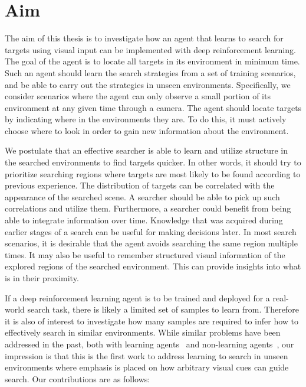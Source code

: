 \section{Aim}
\label{sec:aim}

The aim of this thesis is to investigate how an agent that learns to search for targets using visual input can be implemented with deep reinforcement learning.
The goal of the agent is to locate all targets in its environment in minimum time.
Such an agent should learn the search strategies from a set of training scenarios, and be able to carry out the strategies in unseen environments.
Specifically, we consider scenarios where the agent can only observe a small portion of its environment at any given time through a camera.
The agent should locate targets by indicating where in the environments they are.
To do this, it must actively choose where to look in order to gain new information about the environment.

We postulate that an effective searcher is able to learn and utilize structure in the searched environments to find targets quicker.
In other words, it should try to prioritize searching regions where targets are most likely to be found according to previous experience.
The distribution of targets can be correlated with the appearance of the searched scene.
A searcher should be able to pick up such correlations and utilize them.
Furthermore, a searcher could benefit from being able to integrate information over time.
Knowledge that was acquired during earlier stages of a search can be useful for making decisions later.
In most search scenarios, it is desirable that the agent avoids searching the same region multiple times.
It may also be useful to remember structured visual information of the explored regions of the searched environment.
This can provide insights into what is in their proximity.

If a deep reinforcement learning agent is to be trained and deployed for a real-world search task, there is likely a limited set of samples to learn from.
Therefore it is also of interest to investigate how many samples are required to infer how to effectively search in similar environments.
While similar problems have been addressed in the past, both with learning agents~\cite{minut_reinforcement_2001,mirowski_learning_2017,ourselin_artificial_2016,caicedo_active_2015} and non-learning agents~\cite{shubina_visual_2010,forssen_informed_2008},
our impression is that this is the first work to address learning to search in unseen environments where emphasis is placed on how arbitrary visual cues can guide search.
Our contributions are as follows:

